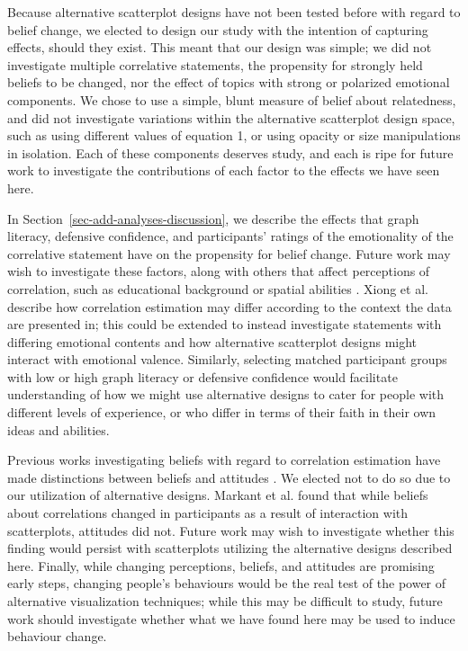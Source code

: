 \documentclass[sigconf]{acmart}
\begin{document}
Because alternative scatterplot designs have not been tested before with
regard to belief change, we elected to design our study with the
intention of capturing effects, should they exist. This meant that our
design was simple; we did not investigate multiple correlative
statements, the propensity for strongly held beliefs to be changed, nor
the effect of topics with strong or polarized emotional components. We
chose to use a simple, blunt measure of belief about relatedness, and
did not investigate variations within the alternative scatterplot design
space, such as using different values of equation 1, or using opacity or
size manipulations in isolation. Each of these components deserves
study, and each is ripe for future work to investigate the contributions
of each factor to the effects we have seen here.

In Section~\ref{sec-add-analyses-discussion}, we describe the effects
that graph literacy, defensive confidence, and participants' ratings of
the emotionality of the correlative statement have on the propensity for
belief change. Future work may wish to investigate these factors, along
with others that affect perceptions of correlation, such as educational
background or spatial abilities \citep{tandon_2024}. Xiong et al.
\citep{xiong_2022} describe how correlation estimation may differ
according to the context the data are presented in; this could be
extended to instead investigate statements with differing emotional
contents and how alternative scatterplot designs might interact with
emotional valence. Similarly, selecting matched participant groups with
low or high graph literacy or defensive confidence would facilitate
understanding of how we might use alternative designs to cater for
people with different levels of experience, or who differ in terms of
their faith in their own ideas and abilities.

Previous works investigating beliefs with regard to correlation
estimation have made distinctions between beliefs and attitudes
\citep{xiong_2022, markant_2023}. We elected not to do so due to our
utilization of alternative designs. Markant et al. \citep{markant_2023}
found that while beliefs about correlations changed in participants as a
result of interaction with scatterplots, attitudes did not. Future work
may wish to investigate whether this finding would persist with
scatterplots utilizing the alternative designs described here. Finally,
while changing perceptions, beliefs, and attitudes are promising early
steps, changing people's behaviours would be the real test of the power
of alternative visualization techniques; while this may be difficult to
study, future work should investigate whether what we have found here
may be used to induce behaviour change.
\end{document}

